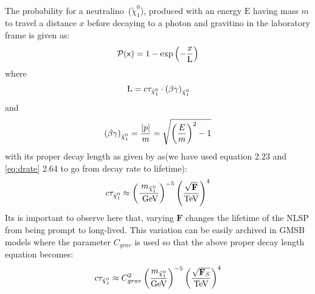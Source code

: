 {\paragraph*{}
The probability for a neutralino~($\tilde{\chi}^{0}_{1}$), produced with an energy $\displaystyle{\mathrm{E}}$ having mass $m$ to travel a distance $x$ before decaying to a photon and gravitino in the laboratory frame is given as:
\begin{equation}{\label{eq:prop}}
\displaystyle{\mathcal{P}(\mathsf{x}) = 1 - \exp{\left(- \frac{x}{\mathrm{L}} \right)} }
\end{equation}
where
\begin{equation}{\label{eq:dl}}
\displaystyle{\mathrm{L} = c\tau_{\tilde{\chi}^{0}_{1}}\cdot\left(\beta\gamma\right)_{\tilde{\chi}^{0}_{1}}}
\end{equation}
and
\begin{equation}{\label{eq:ctau}}
\displaystyle{\left(\beta\gamma\right)_{\tilde{\chi}^{0}_{1}} = \frac{|p|}{m} = \sqrt{\left(\frac{E}{m}\right)^{2} - 1} }
\end{equation}
with its proper decay length as given by as(we have used equation 2.23 and \ref{eq:drate} 2.64 to go from decay rate to lifetime):
\begin{equation}{\label{eq:DRate}}
c\tau_{\tilde{\chi}^{0}_{1}} \approx \left(\frac{m_{\tilde{\chi}^{0}_{1}}}{\mbox{ GeV}}\right)^{-5}\left(\frac{\sqrt{\mathbf{F}}}{\mbox{TeV}}\right)^{4}
\end{equation}
Its is important to observe here that, varying $\mathbf{F}$ changes the lifetime of the NLSP from being prompt to long-lived.
This variation can be easily archived in GMSB models where the parameter $C_{grav}$ is used so that the above proper decay length equation becomes:
\begin{equation}{\label{eq:pdlength}}
c\tau_{\tilde{\chi}^{0}_{1}} \approx C^{2}_{grav} \left(\frac{m_{\tilde{\chi}^{0}_{1}}}{\mbox{GeV}}\right)^{-5}\left(\frac{\sqrt{\mathbf{F}_{S}}}{\mbox{TeV}}\right)^{4}
\end{equation}

}
